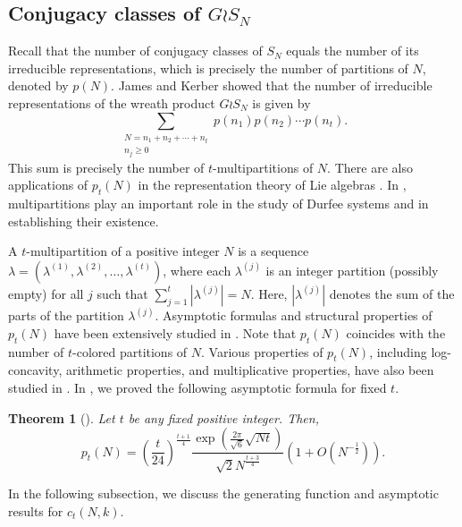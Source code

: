 \documentclass[11pt]{amsart}
\theoremstyle{plain}
\newtheorem{theorem}{Theorem}[section]
\numberwithin{equation}{section}
\begin{document}
	\subsection{Conjugacy classes of
		\texorpdfstring{$G\wr S_N$}{G wr S\_N}}
	Recall that the number of conjugacy classes of $S_N$ equals the number
	of its irreducible representations, which is precisely the number of
	partitions of $N$, denoted by $p(N)$. James and Kerber
	\cite[Corollary 4.4.4]{MR644144} showed that the number of irreducible
	representations of the wreath product $G\wr S_N$ is given by
	\begin{equation*}
		\sum_{\substack{N=n_1+n_2+\cdots+n_t\\ n_j\geq 0}}
		p(n_1)p(n_2)\cdots p(n_t).
	\end{equation*}
	This sum is precisely the number of $t$-multipartitions of $N$. There are also applications of $p_t(N)$ in the representation theory of Lie algebras \cite{bouwknegt,fayers}. In \cite{bouwknegt}, multipartitions play an important role in the study of Durfee systems and in establishing their existence.
	
	
	A $t$-multipartition of a positive integer $N$ is a sequence $\lambda = (\lambda^{(1)}, \lambda^{(2)}, 
	\dots, \lambda^{(t)})$, where each $\lambda^{(j)}$ is an integer partition (possibly empty) for all $j$ such that $\sum_{j=1}^{t}\left|\lambda^{(j)}\right|=N$. Here, $\left|\lambda^{(j)}\right|$ denotes the sum of the parts of the partition $\lambda^{(j)}$. Asymptotic formulas and structural
	properties of $p_t(N)$ have been extensively studied in
	\cite{andrews,atkin,barman3,murty}. Note that $p_t(N)$ coincides with the number of $t$-colored partitions
	of $N$. Various properties of $p_t(N)$,
	including log-concavity, arithmetic properties, and multiplicative
	properties, have also been studied in
	\cite{bringmann,bringmann1,chern}. In \cite{barman3}, we proved the following asymptotic formula for fixed
	$t$.
	\begin{theorem}[{\cite[Corollary 1.4]{barman3}}]\label{thm-murty}
		Let $t$ be any fixed
		positive integer. Then,
		\begin{equation*}
			p_{t}(N)=\left(\frac{t}{24}\right)^{\frac{t+1}{4}}\frac{\exp\left(\frac{2\pi}{\sqrt{6}}\sqrt{Nt}\right)}{\sqrt{2}N^{\frac{t+3}{4}}}\left(1+O\left(N^{-\frac{1}{2}}\right)\right).
		\end{equation*}  
	\end{theorem}
	In the following subsection, we discuss the generating function and asymptotic results for $c_t(N,k)$.
\end{document}

